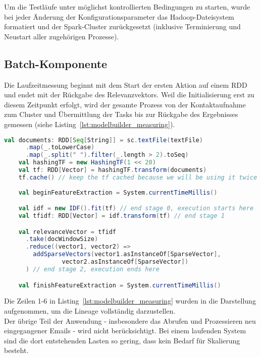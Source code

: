 Um die Testläufe unter möglichst kontrollierten Bedingungen zu starten, wurde bei jeder Änderung der Konfigurationsparameter das Hadoop-Dateisystem formatiert und der Spark-Cluster zurückgesetzt (inklusive Terminierung und Neustart aller zugehörigen Prozesse).

\subsection{Batch-Komponente}

Die Laufzeitmessung beginnt mit dem Start der ersten Aktion auf einem \gls{RDD} und endet mit der Rückgabe des Relevanzvektors.
Weil die Initialisierung erst zu diesem Zeitpunkt erfolgt, wird der gesamte Prozess von der Kontaktaufnahme zum Cluster und Übermittlung der Tasks bis zur Rückgabe des Ergebnisses gemessen (siehe Listing~\ref{lst:modelbuilder_measuring}).\\

\begin{lstlisting}[language=Scala,caption={Laufzeitmessung},label={lst:modelbuilder_measuring}]
    val documents: RDD[Seq[String]] = sc.textFile(textFile)
      .map(_.toLowerCase)
      .map(_.split(" ").filter(_.length > 2).toSeq)
    val hashingTF = new HashingTF(1 << 20)
    val tf: RDD[Vector] = hashingTF.transform(documents)
    tf.cache() // keep the tf cached because we will be using it twice
		
    val beginFeatureExtraction = System.currentTimeMillis()

    val idf = new IDF().fit(tf) // end stage 0, execution starts here
    val tfidf: RDD[Vector] = idf.transform(tf) // end stage 1

    val relevanceVector = tfidf
      .take(docWindowSize)
      .reduce((vector1, vector2) =>
        addSparseVectors(vector1.asInstanceOf[SparseVector], 
				vector2.asInstanceOf[SparseVector])
      ) // end stage 2, execution ends here

    val finishFeatureExtraction = System.currentTimeMillis()
\end{lstlisting}

Die Zeilen 1-6 in Listing~\ref{lst:modelbuilder_measuring} wurden in die Darstellung aufgenommen, um die Lineage vollständig darzustellen.\\

Der übrige Teil der Anwendung - insbesondere das Abrufen und Prozessieren neu eingegangener Emails - wird nicht berücksichtigt. Bei einem laufenden System sind die dort entstehenden Lasten so gering, dass kein Bedarf für Skalierung besteht.

